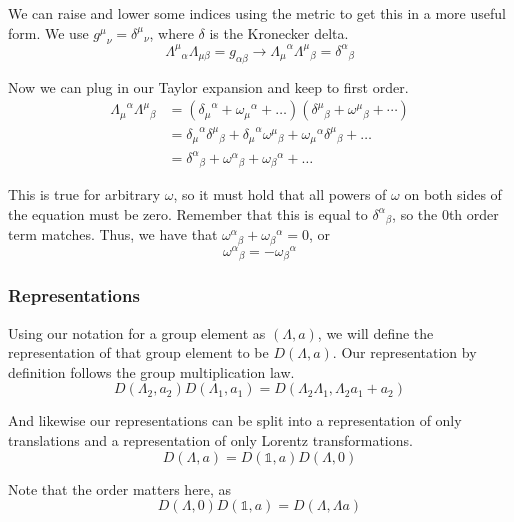 \documentclass[12pt]{article}
\begin{document}
We can raise and lower some indices using the metric to get this in a more useful form. We use ${g^\mu}_\nu={\delta^\mu}_\nu$, where $\delta$ is the Kronecker delta.
\begin{equation}
    {\Lambda^\mu}_\alpha \Lambda_{\mu\beta}=g_{\alpha\beta}\rightarrow {\Lambda_\mu}^\alpha {\Lambda^\mu}_\beta={\delta^\alpha}_\beta
\end{equation} 

Now we can plug in our Taylor expansion and keep to first order.
\begin{align*}
    {\Lambda_\mu}^\alpha {\Lambda^\mu}_\beta&=({\delta_\mu}^\alpha+{\omega_\mu}^\alpha+\dots)({\delta^\mu}_\beta+{\omega^\mu}_\beta+\cdots) \\
    &= {\delta_\mu}^\alpha{\delta^\mu}_\beta+{\delta_\mu}^\alpha{\omega^\mu}_\beta+{\omega_\mu}^\alpha{\delta^\mu}_\beta+\dots\\
    &={\delta^\alpha}_\beta+{\omega^\alpha}_\beta+{\omega_\beta}^\alpha+\dots
\end{align*}

This is true for arbitrary $\omega$, so it must hold that all powers of $\omega$ on both sides of the equation must be zero. Remember that this is equal to ${\delta^\alpha}_\beta$, so the 0th order term matches. Thus, we have that ${\omega^\alpha}_\beta+{\omega_\beta}^\alpha=0$, or
\begin{equation}
    {\omega^\alpha}_\beta=-{\omega_\beta}^\alpha
\end{equation}

\subsubsection{Representations}
Using our notation for a group element as $(\Lambda,a)$, we will define the representation of that group element to be $D(\Lambda,a)$. Our representation by definition follows the group multiplication law.
\begin{equation}
    D(\Lambda_2,a_2)D(\Lambda_1,a_1)=D(\Lambda_2\Lambda_1,\Lambda_2a_1+a_2)
\end{equation}

And likewise our representations can be split into a representation of only translations and a representation of only Lorentz transformations.
\begin{equation}
    D(\Lambda,a)=D(\mathbb{1},a)D(\Lambda,0)
\end{equation}

Note that the order matters here, as
\begin{equation}
    D(\Lambda,0)D(\mathbb{1},a)=D(\Lambda,\Lambda a)
\end{equation}
\end{document}
